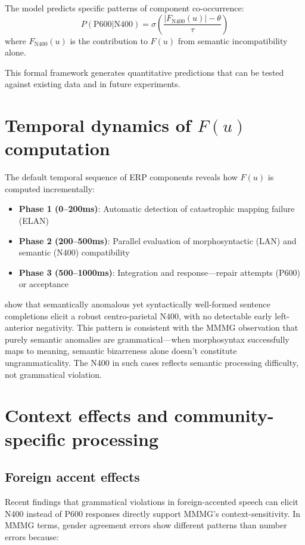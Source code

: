 \documentclass[12pt,letterpaper]{article}
\begin{document}
The model predicts specific patterns of component co-occurrence:
\[
P(\text{P600} | \text{N400}) = \sigma\left(\frac{|F_{\text{N400}}(u)| - \theta}{\tau}\right)
\]
where $F_{\text{N400}}(u)$ is the contribution to $F(u)$ from semantic incompatibility alone.

This formal framework generates quantitative predictions that can be tested against existing data and in future experiments.
\section{Temporal dynamics of \texorpdfstring{$F(u)$}{F(u)} computation}

The default temporal sequence of ERP components reveals how $F(u)$ is computed incrementally:
\begin{itemize}
    \item \textbf{Phase 1 (0--200ms)}: Automatic detection of catastrophic mapping failure (ELAN)
    \item \textbf{Phase 2 (200--500ms)}: Parallel evaluation of morphosyntactic (LAN) and semantic (N400) compatibility
    \item \textbf{Phase 3 (500--1000ms)}: Integration and response---repair attempts (P600) or acceptance
\end{itemize}

\textcite{Wlotko2013} show that semantically anomalous yet syntactically well-formed sentence completions elicit a robust centro-parietal N400, with no detectable early left-anterior negativity. This pattern is consistent with the MMMG observation that purely semantic anomalies are grammatical—when morphosyntax successfully maps to meaning, semantic bizarreness alone doesn't constitute ungrammaticality. The N400 in such cases reflects semantic processing difficulty, not grammatical violation.



\section{Context effects and community-specific processing}
\subsection{Foreign accent effects}
Recent findings that grammatical violations in foreign-accented speech can elicit N400 instead of P600 responses \autocite{Hanulova2019} directly support MMMG's context-sensitivity. In MMMG terms, gender agreement errors show different patterns than number errors because:
\end{document}
